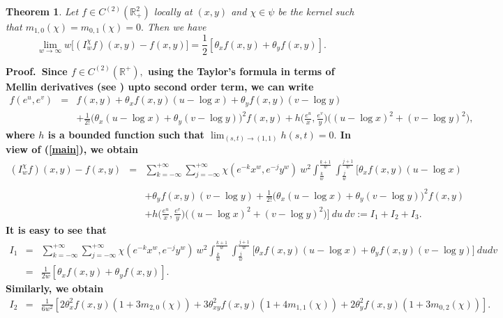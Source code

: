 \documentclass[12pt]{article}
\newtheorem{thm}{Theorem}[section]
\begin{document}
{\begin{thm}\label{theorem2}
Let $ f \in C^{(2)}(\mathbb{R}^{2}_{+})$ locally at $(x,y)$ and $\chi \in \psi$ be the kernel such that $m_{1,0}(\chi)=m_{0,1}(\chi)=0.$ Then we have
$$ \lim_{w\rightarrow \infty} w \big[ (I_{w}^{\chi}f)(x,y) - f(x,y) \big] = \frac{1}{2} \left[ \theta_{x} f(x,y)+\theta_{y} f(x,y) \right].$$
 \end{thm}

\noindent\bf{Proof.}\rm \ Since $f \in C^{(2)}(\mathbb{R}^{+}),$ using the Taylor's formula in terms of Mellin derivatives (see \cite{butzer3,bardaro7}) upto second order term, we can write
\begin{eqnarray*}
f(e^{u},e^{v})&=& f(x,y)+ \theta_{x} f(x,y) (u- \log x)+\theta_{y} f(x,y) (v- \log y) \\&& + \frac{1}{2!}\Big(\theta_{x} (u- \log x)+\theta_{y} (v- \log y)\Big)^{2}f(x,y) + h \Big(\frac{e^{u}}{x},\frac{e^{v}}{y}\Big) \Big( (u- \log x)^{2}+ (v- \log y)^{2}\Big),
\end{eqnarray*}
 where $h$ is a bounded function such that $\displaystyle \lim_{(s,t) \rightarrow (1,1)} h(s,t)=0.$ In view of (\ref{main}), we obtain
\begin{eqnarray*}
(I_{w}^{\chi}f)(x,y) - f(x,y) &=& \sum_{k= - \infty}^{+\infty}\sum_{j= - \infty}^{+\infty} \chi(e^{-k} x^{w},e^{-j} y^{w})\  w^{2} \int_{\frac{k}{w}}^{\frac{k+1}{w}} \int_{\frac{j}{w}}^{\frac{j+1}{w}} \Big [ \theta_{x} f(x,y) (u- \log x)\\
\\&&+ \theta_{y} f(x,y) (v- \log y) + \frac{1}{2!}\Big(\theta_{x} (u- \log x) +\theta_{y} (v- \log y)\Big)^{2}f(x,y) \\&&
+ h \Big(\frac{e^{u}}{x},\frac{e^{v}}{y}\Big) \Big( (u- \log x)^{2}+ (v- \log y)^{2}\Big) \Big] \ du\ dv
:= I_{1}+I_{2}+ I_{3}.
\end{eqnarray*}
It is easy to see that
\begin{eqnarray*}
I_{1}&=& \sum_{k= - \infty}^{+\infty}\sum_{j= - \infty}^{+\infty} \chi(e^{-k} x^{w},e^{-j} y^{w})\  w^{2} \int_{\frac{k}{w}}^{\frac{k+1}{w}} \int_{\frac{j}{w}}^{\frac{j+1}{w}}\Big[\theta_{x} f(x,y) (u- \log x)
 + \theta_{y} f(x,y) (v- \log y) \Big]\ dudv \\
&=& \frac{1}{2w} \left[ \theta_{x} f(x,y)+\theta_{y} f(x,y) \right] .
\end{eqnarray*}
Similarly, we obtain
\begin{eqnarray*}
I_{2} &=& \frac{1}{6w^{2}} \left[2\theta_{x}^{2} f(x,y)\left( 1+3m_{2,0}(\chi)\right)+3\theta_{xy}^{2} f(x,y)\left( 1+4m_{1,1}(\chi)\right)+2\theta_{y}^{2} f(x,y)\left( 1+3m_{0,2}(\chi)\right) \right].

\end{eqnarray*}}
\end{document}
